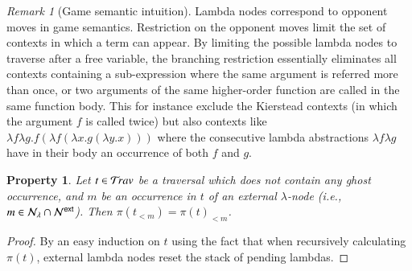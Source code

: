 \documentclass{elsarticle}
\makeatletter
\theoremstyle{plain}
\newtheorem{property}[theorem]{Property}
\theoremstyle{definition}
\theoremstyle{remark}
\newtheorem{remark}{Remark}[section]
\newcommand\Nodes{\mathcal{N}}%
\newcommand\NodesLmd{\Nodes_\lambda}%
\newcommand{\travulc}{\travset}
\def\coresymbol{\pi} %
\newcommand{\core}[1]{\coresymbol(#1)} %
\newcommand{\ExtNodes}{\Nodes^{\sf ext}}
\renewcommand\ie{{\it i.e.\@\xspace}}
\makeatother
\begin{document}
\begin{remark}[Game semantic intuition]
Lambda nodes correspond to opponent moves in game semantics. Restriction on the opponent moves limit the set of contexts in which a term can appear.
By limiting the possible lambda nodes to traverse after a free variable, the branching restriction essentially eliminates all contexts containing a sub-expression where the same argument is referred more than once, or two arguments of the same higher-order function are called in the same function body. This for instance exclude the Kierstead contexts (in which the argument $f$ is called twice) but also contexts like  $\lambda f \lambda g . f (\lambda f (\lambda x . g (\lambda y . x)))$ where the consecutive lambda abstractions $\lambda f \lambda g$ have in their body an occurrence of both $f$ and $g$.
\end{remark}

\begin{property}
\label{prop:core_truncation_at_externallambda}
Let $t\in\travulc$ be a traversal which does not contain any ghost occurrence, and $m$ be an occurrence in $t$ of an external $\lambda$-node (\ie, $m \in \NodesLmd\inter\ExtNodes$). Then $\core{t_{<m}} = \core{t}_{<m}$.
\end{property}
\begin{proof}
By an easy induction on $t$ using the fact that when recursively calculating $\coresymbol(t)$, external lambda nodes reset the stack of pending lambdas.
\end{proof}
\end{document}
